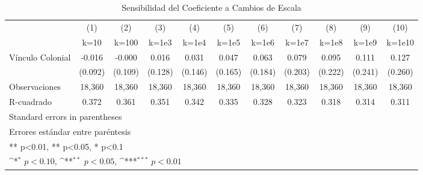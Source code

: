 \begin{table}[htbp]\centering
\def\sym#1{\ifmmode^{#1}\else\(^{#1}\)\fi}
\caption{Sensibilidad del Coeficiente a Cambios de Escala}
\begin{tabular}{l*{10}{c}}
\hline\hline
                    &\multicolumn{1}{c}{(1)}&\multicolumn{1}{c}{(2)}&\multicolumn{1}{c}{(3)}&\multicolumn{1}{c}{(4)}&\multicolumn{1}{c}{(5)}&\multicolumn{1}{c}{(6)}&\multicolumn{1}{c}{(7)}&\multicolumn{1}{c}{(8)}&\multicolumn{1}{c}{(9)}&\multicolumn{1}{c}{(10)}\\
                    &\multicolumn{1}{c}{k=10}&\multicolumn{1}{c}{k=100}&\multicolumn{1}{c}{k=1e3}&\multicolumn{1}{c}{k=1e4}&\multicolumn{1}{c}{k=1e5}&\multicolumn{1}{c}{k=1e6}&\multicolumn{1}{c}{k=1e7}&\multicolumn{1}{c}{k=1e8}&\multicolumn{1}{c}{k=1e9}&\multicolumn{1}{c}{k=1e10}\\
\hline
Vínculo Colonial    &      -0.016         &      -0.000         &       0.016         &       0.031         &       0.047         &       0.063         &       0.079         &       0.095         &       0.111         &       0.127         \\
                    &     (0.092)         &     (0.109)         &     (0.128)         &     (0.146)         &     (0.165)         &     (0.184)         &     (0.203)         &     (0.222)         &     (0.241)         &     (0.260)         \\
\hline
Observaciones       &      18,360         &      18,360         &      18,360         &      18,360         &      18,360         &      18,360         &      18,360         &      18,360         &      18,360         &      18,360         \\
R-cuadrado          &       0.372         &       0.361         &       0.351         &       0.342         &       0.335         &       0.328         &       0.323         &       0.318         &       0.314         &       0.311         \\
\hline\hline
\multicolumn{11}{l}{\footnotesize Standard errors in parentheses}\\
\multicolumn{11}{l}{\footnotesize Errores estándar entre paréntesis}\\
\multicolumn{11}{l}{\footnotesize *** p<0.01, ** p<0.05, * p<0.1}\\
\multicolumn{11}{l}{\footnotesize \sym{*} \(p<0.10\), \sym{**} \(p<0.05\), \sym{***} \(p<0.01\)}\\
\end{tabular}
\end{table}
